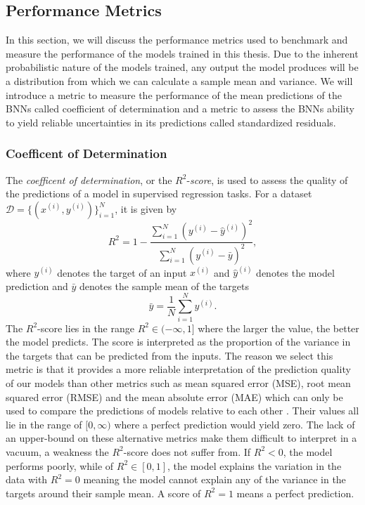 \subsection{Performance Metrics}\label{sec:perf_metrics}
In this section, we will discuss the performance metrics used to benchmark and measure the performance of the models trained in this thesis.
Due to the inherent probabilistic nature of the models trained, any output the model produces will be a distribution from which we can calculate
a sample mean and variance. 
We will introduce a metric to measure the performance of the mean predictions of the BNNs called coefficient of determination and a metric to assess the BNNs ability to yield reliable uncertainties in its predictions called standardized residuals.

\subsubsection{Coefficent of Determination}
The \textit{coefficent of determination}, or the $R^2$-\textit{score}, is used to assess the quality of the predictions of a model in supervised regression tasks. For a dataset $\mathcal{D} = \{(x^{(i)}, y^{(i)})\}_{i=1}^N$, it is given by
\begin{equation}\label{eq:r2_score}
    R^2 = 1 - \frac{\sum_{i=1}^N (y^{(i)} - \hat{y}^{(i)})^2}{\sum_{i=1}^N (y^{(i)} - \bar{y})^2},
\end{equation}
where $y^{(i)}$ denotes the target of an input $x^{(i)}$ and $\hat{y}^{(i)}$ denotes the model prediction and $\bar{y}$ denotes the sample mean of the targets
\begin{equation}
    \bar{y} = \frac{1}{N}\sum_{i=1}^N y^{(i)}.
\end{equation}
The $R^2$-score lies in the range $R^2 \in (-\infty, 1]$ where the larger the value, the better the model predicts. The score is interpreted as the proportion of the variance in the targets that can be predicted from the inputs. The reason we select this metric is that it provides a more reliable interpretation of the prediction quality of our models than other metrics such as mean squared error (MSE), root mean squared error (RMSE) and the mean absolute error (MAE) which can only be used to compare the predictions of models relative to each other \cite{r2_score}. Their values all lie in the range of $[0, \infty)$ where a perfect prediction would yield zero. The lack of an upper-bound on these alternative metrics make them difficult to interpret in a vacuum, a weakness the $R^2$-score does not suffer from. If $R^2 < 0$, the model performs poorly, while of $R^2 \in [0, 1]$, the model explains the variation in the data with $R^2 = 0$ meaning the model cannot explain any of the variance in the targets around their sample mean. A score of $R^2 = 1$ means a perfect prediction.

